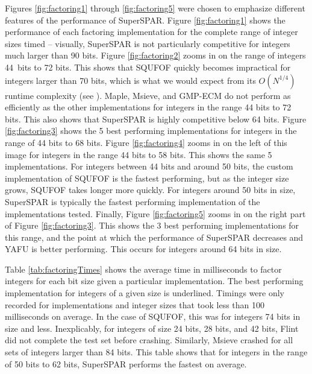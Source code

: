 \documentclass{ucalgthes1}
\theoremstyle{definition}
\begin{document}
Figures \ref{fig:factoring1} through \ref{fig:factoring5} were chosen to emphasize different features of the performance of SuperSPAR.  Figure \ref{fig:factoring1} shows the performance of each factoring implementation for the complete range of integer sizes timed -- visually, SuperSPAR is not particularly competitive for integers much larger than 90 bits.  Figure \ref{fig:factoring2} zooms in on the range of integers \mbox{44 bits} to 72 bits.  This shows that SQUFOF quickly becomes impractical for integers larger than 70 bits, which is what we would expect from its $O(N^{1/4})$ runtime complexity (see \cite[Theorem 4.22]{Gower2008}).  Maple, Msieve, and GMP-ECM do not perform as efficiently as the other implementations for integers in the range 44 bits to 72 bits.  This also shows that SuperSPAR is highly competitive below 64 bits.  Figure \ref{fig:factoring3} shows the 5 best performing implementations for integers in the range of 44 bits to 68 bits.  Figure \ref{fig:factoring4} zooms in on the left of this image for integers in the range 44 bits to 58 bits.  This shows the same 5 implementations.  For integers between 44 bits and around 50 bits, the custom implementation of SQUFOF is the fastest performing, but as the integer size grows, SQUFOF takes longer more quickly.  For integers around 50 bits in size, SuperSPAR is typically the fastest performing implementation of the implementations tested.   Finally, Figure \ref{fig:factoring5} zooms in on the right part of Figure \ref{fig:factoring3}.  This shows the 3 best performing implementations for this range, and the point at which the performance of SuperSPAR decreases and YAFU is better performing.  This occurs for integers around 64 bits in size.

Table \ref{tab:factoringTimes} shows the average time in milliseconds to factor integers for each bit size given a particular implementation.  The best performing implementation for integers of a given size is underlined.  Timings were only recorded for implementations and integer sizes that took less than 100 milliseconds on average.  In the case of SQUFOF, this was for integers 74 bits in size and less.  Inexplicably, for integers of size 24 bits, 28 bits, and 42 bits, Flint did not complete the test set before crashing.  Similarly, Msieve crashed for all sets of integers larger than 84 bits.  This table shows that for integers in the range of 50 bits to 62 bits, SuperSPAR performs the fastest on average.  
\end{document}
